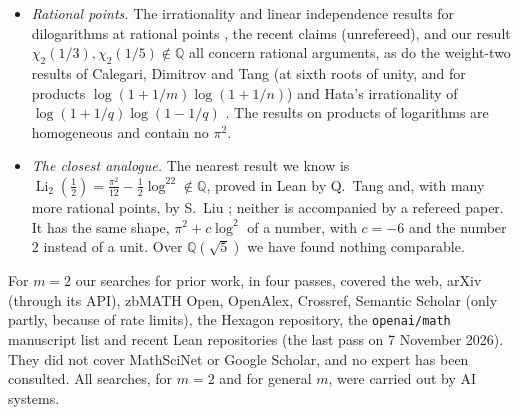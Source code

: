 \documentclass[11pt]{amsart}
\theoremstyle{definition}
\theoremstyle{remark}
\numberwithin{equation}{section}
\newcommand{\QQ}{\mathbb{Q}}
\newcommand{\Li}{\operatorname{Li}}
\begin{document}
\begin{itemize}
  $\chi_2(\sqrt5-2)=\frac12(\Li_2(z)-\Li_2(-z))=z+\frac z4\Phi_2(\frac12,z^2)$, where
  $\Phi_2(x,q)=\sum_{k\ge0}q^{k+1}/(k+x+1)^2$ is the Lerch function and $z=\sqrt5-2=\varphi^{-3}$ is a unit of height
  $\frac32\log\varphi=0.7218\ldots$ whose conjugate $-\varphi^3$ has absolute value $>1$, so that $|z|\,|\sigma z|=1$.
  Evaluating the criteria in the form they are stated, their key quantity is negative by a wide margin at this
  point: about $-26.1$ for \cite[Thm.~2.2]{Kawashima2026}, about $-15.1$ and $-14.5$ for the two ways of applying
  \cite[Thm.~1]{DHK2022b} (through $\Li_2(\pm z)$, or through $\Phi_2(\frac12,z^2)$), and about $-14.0$ for
  \cite[Thm.~2.1]{DHK2020} (through $\Phi_2(\frac12,z^2)$, normalised as in Section~\ref{sec:lit}). The
  Bombieri--Andr\'e bound of \cite{Orr2026}, applied to this system, needs by our estimate a height of about $1450$.
  These evaluations are ours and have not been checked by the authors of the criteria.
\item \emph{Rational points.} The irrationality and linear independence results for dilogarithms at rational points
  \cite{Hata1990,Hata1993,RhinViola2005,RhinViola2019,ViolaZudilin2018}, the recent claims
  \cite{Prellberg2026,TanZhang2026} (unrefereed), and our result $\chi_2(1/3),\chi_2(1/5)\notin\QQ$ \cite{Chi2Paper} all
  concern rational arguments, as do the weight-two results of Calegari, Dimitrov and Tang \cite{CDT} (at sixth roots
  of unity, and for products $\log(1+1/m)\log(1+1/n)$) and Hata's irrationality of $\log(1+1/q)\log(1-1/q)$
  \cite{Hata1998}. The results on products of logarithms are homogeneous and contain no $\pi^2$.
\item \emph{The closest analogue.} The nearest result we know is $\Li_2(\frac12)=\frac{\pi^2}{12}-\frac12\log^22\notin\QQ$,
  proved in Lean by Q.~Tang \cite{TangLi2} and, with many more rational points, by S.~Liu \cite{LiuLi2}; neither is
  accompanied by a refereed paper. It has the same shape, $\pi^2+c\log^2$ of a number, with $c=-6$ and the number $2$
  instead of a unit. Over $\QQ(\sqrt5)$ we have found nothing comparable.
\end{itemize}
For $m=2$ our searches for prior work, in four passes, covered the web, arXiv (through its API), zbMATH Open, OpenAlex,
Crossref, Semantic Scholar (only partly, because of rate limits), the Hexagon repository, the \texttt{openai/math}
manuscript list and recent Lean repositories (the last pass on 7 November 2026). They did not cover MathSciNet or Google
Scholar, and no expert has been consulted. All searches, for $m=2$ and for general $m$, were carried out by AI systems.
\end{document}
